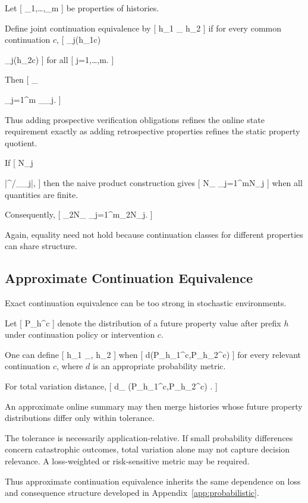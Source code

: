 \documentclass[11pt]{article}
\begin{document}
Let
[
\Phi_1,\ldots,\Phi_m
]
be properties of histories.

Define joint continuation equivalence by
[
h_1
\equiv_{\boldsymbol\Phi}
h_2
]
if for every common continuation $c$,
[
\Phi_j(h_1c)

\Phi_j(h_2c)
]
for all
[
j=1,\ldots,m.
]

Then
[
\equiv_{\boldsymbol\Phi}

\bigcap_{j=1}^{m}
\equiv_{\Phi_j}.
]

Thus adding prospective verification obligations refines the online state requirement exactly as adding retrospective properties refines the static property quotient.

If
[
N_j

|\Sigma^\ast/{\equiv_{\Phi_j}}|,
]
then the naive product construction gives
[
N_{\boldsymbol\Phi}
\leq
\prod_{j=1}^{m}N_j
]
when all quantities are finite.

Consequently,
[
\log_2N_{\boldsymbol\Phi}
\leq
\sum_{j=1}^{m}\log_2N_j.
]

Again, equality need not hold because continuation classes for different properties can share structure.

\subsection{Approximate Continuation Equivalence}

Exact continuation equivalence can be too strong in stochastic environments.

Let
[
P_h^c
]
denote the distribution of a future property value after prefix $h$ under continuation policy or intervention $c$.

One can define
[
h_1
\equiv_{\Phi,\varepsilon}
h_2
]
when
[
d(P_{h_1}^c,P_{h_2}^c)
\leq\varepsilon
]
for every relevant continuation $c$, where $d$ is an appropriate probability metric.

For total variation distance,
[
d_{}
(P_{h_1}^c,P_{h_2}^c)
\leq\varepsilon.
]

An approximate online summary may then merge histories whose future property distributions differ only within tolerance.

The tolerance is necessarily application-relative. If small probability differences concern catastrophic outcomes, total variation alone may not capture decision relevance. A loss-weighted or risk-sensitive metric may be required.

Thus approximate continuation equivalence inherits the same dependence on loss and consequence structure developed in Appendix~\ref{app:probabilistic}.
\end{document}

